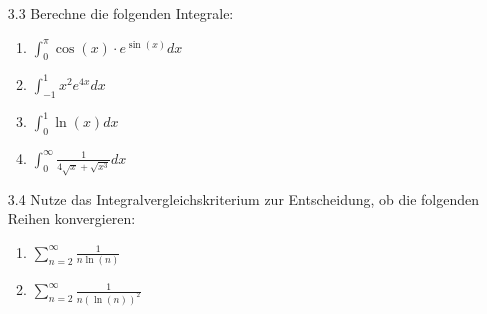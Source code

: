 \documentclass{HM}
\begin{document}
	\begin{enumerate}
		\item[3.3] Berechne die folgenden Integrale:
		\begin{enumerate}
			\item $\int_0^\pi\cos(x)\cdot e^{\sin(x)}dx$
			\item $\int_{-1}^1x^2e^{4x}dx$
			\item $\int_0^1\ln(x)dx$
			\item $\int_0^\infty\frac{1}{4\sqrt{x}+\sqrt{x^3}}dx$
		\end{enumerate}
		
		\item[3.4] Nutze das Integralvergleichskriterium zur Entscheidung, ob die folgenden Reihen konvergieren:
		\begin{enumerate}
			\item $\sum\limits_{n=2}^\infty\frac{1}{n\ln(n)}$
			\item $\sum\limits_{n=2}^\infty\frac{1}{n(\ln(n))^2}$
		\end{enumerate}
		

\end{enumerate}
\end{document}
